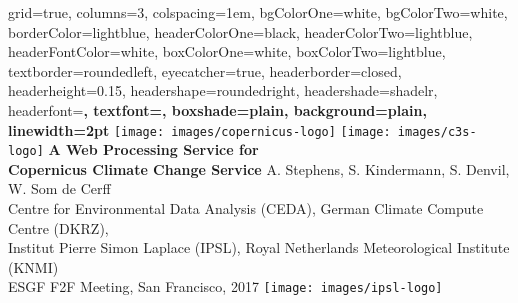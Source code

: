 \documentclass[portrait,a0paper]{baposter}
\begin{document}


\begin{poster}%
  {
  grid=true,
  columns=3,
  colspacing=1em,
  bgColorOne=white,
  bgColorTwo=white,
  borderColor=lightblue,
  headerColorOne=black,
  headerColorTwo=lightblue,
  headerFontColor=white,
  boxColorOne=white,
  boxColorTwo=lightblue,
  textborder=roundedleft,
  eyecatcher=true,
  headerborder=closed,
  headerheight=0.15\textheight,
  headershape=roundedright,
  headershade=shadelr,
  headerfont=\Large\bf\textsc, %
  textfont={\setlength{\parindent}{1.5em}},
  boxshade=plain,
  background=plain,
  linewidth=2pt
  }
  {
    \texttt{[image: images/copernicus-logo]}
    \texttt{[image: images/c3s-logo]}
  }
  {\sf\bf
          A Web Processing Service for\\ Copernicus Climate Change Service
  }
  {
    \vspace{1em} A. Stephens, S. Kindermann, S. Denvil, W. Som de Cerff\\
    {\smaller Centre for Environmental Data Analysis (CEDA),
    German Climate Compute Centre (DKRZ),\\
    Institut Pierre Simon Laplace (IPSL),
    Royal Netherlands Meteorological Institute (KNMI)\\[1em]
    ESGF F2F Meeting, San Francisco, 2017}
  }
  {
    \texttt{[image: images/ipsl-logo]}
  }



\end{poster}
\end{document}
